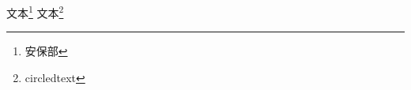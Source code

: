 \documentclass{article}
\begin{document}
\nocite{*}
文本\footnote{安保部}
文本\footnote{circledtext}

\printbibliography[heading=bibliography]
\end{document}
